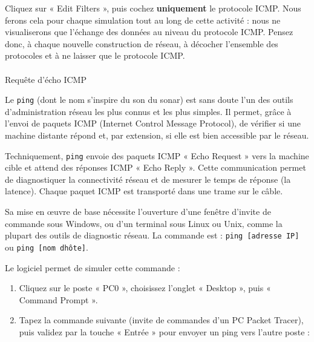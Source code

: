\documentclass[
  french,
  10pt,
  a4paper,
]{scrartcl}
\makeatletter
\let\oldparagraph\paragraph
\renewcommand{\paragraph}{
    \@ifstar
      \xxxParagraphStar
      \xxxParagraphNoStar
  }
\newcommand{\xxxParagraphStar}[1]{\oldparagraph*{#1}\mbox{}}
\newcommand{\xxxParagraphNoStar}[1]{\oldparagraph{#1}\mbox{}}
\providecommand{\tightlist}{%
  \setlength{\itemsep}{0pt}\setlength{\parskip}{0pt}}
\makeatother
\begin{document}
\begin{tcolorbox}[enhanced jigsaw, arc=.35mm, bottomrule=.15mm, bottomtitle=1mm, breakable, colback=white, colbacktitle=quarto-callout-warning-color!10!white, colframe=quarto-callout-warning-color-frame, coltitle=black, left=2mm, leftrule=.75mm, opacityback=0, opacitybacktitle=0.6, rightrule=.15mm, title=\textcolor{quarto-callout-warning-color}{\faExclamationTriangle}\hspace{0.5em}{Filtre ICMP}, titlerule=0mm, toprule=.15mm, toptitle=1mm]

Cliquez sur « Edit Filters », puis cochez \textbf{uniquement} le
protocole ICMP. Nous ferons cela pour chaque simulation tout au long de
cette activité : nous ne visualiserons que l'échange des données au
niveau du protocole ICMP. Pensez donc, à chaque nouvelle construction de
réseau, à décocher l'ensemble des protocoles et à ne laisser que le
protocole ICMP.

\end{tcolorbox}

\paragraph{Requête d'écho ICMP}\label{requuxeate-duxe9cho-icmp}

Le \texttt{ping} (dont le nom s'inspire du son du sonar) est sans doute
l'un des outils d'administration réseau les plus connus et les plus
simples. Il permet, grâce à l'envoi de paquets ICMP (Internet Control
Message Protocol), de vérifier si une machine distante répond et, par
extension, si elle est bien accessible par le réseau.

Techniquement, \texttt{ping} envoie des paquets ICMP « Echo Request »
vers la machine cible et attend des réponses ICMP « Echo Reply ». Cette
communication permet de diagnostiquer la connectivité réseau et de
mesurer le temps de réponse (la latence). Chaque paquet ICMP est
transporté dans une trame sur le câble.

Sa mise en œuvre de base nécessite l'ouverture d'une fenêtre d'invite de
commande sous Windows, ou d'un terminal sous Linux ou Unix, comme la
plupart des outils de diagnostic réseau. La commande est :
\texttt{ping\ {[}adresse\ IP{]}} ou
\texttt{ping\ {[}nom\ d\textquotesingle{}hôte{]}}.

Le logiciel permet de simuler cette commande :

\begin{enumerate}
\def\labelenumi{\arabic{enumi}.}
\tightlist
\item
  Cliquez sur le poste « PC0 », choisissez l'onglet « Desktop », puis «
  Command Prompt ».
\item
  Tapez la commande suivante (invite de commandes d'un PC Packet
  Tracer), puis validez par la touche « Entrée » pour envoyer un ping
  vers l'autre poste :
\end{enumerate}
\end{document}
